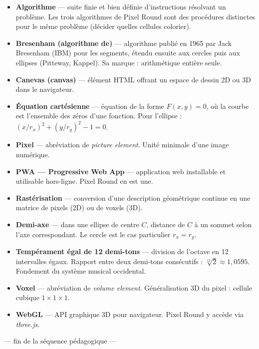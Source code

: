 \documentclass[12pt,a4paper]{scrartcl}
\newcommand{\acc}[1]{\textcolor{accent}{\textbf{#1}}}
\begin{document}
\begin{itemize}[leftmargin=1.4em,itemsep=0.3em,topsep=0.3em]
  \item \acc{Algorithme} --- suite finie et bien définie d'instructions résolvant un problème. Les trois algorithmes de Pixel Round sont des procédures distinctes pour le même problème (décider quelles cellules colorier).
  \item \acc{Bresenham (algorithme de)} --- algorithme publié en 1965 par Jack Bresenham (IBM) pour les segments, étendu ensuite aux cercles puis aux ellipses (Pitteway, Kappel). Sa marque : arithmétique entière seule.
  \item \acc{Canevas (canvas)} --- élément HTML offrant un espace de dessin 2D ou 3D dans le navigateur.
  \item \acc{Équation cartésienne} --- équation de la forme $F(x, y) = 0$, où la courbe est l'ensemble des zéros d'une fonction. Pour l'ellipse : $(x/r_x)^2 + (y/r_y)^2 - 1 = 0$.
  \item \acc{Pixel} --- abréviation de \emph{picture element}. Unité minimale d'une image numérique.
  \item \acc{PWA --- Progressive Web App} --- application web installable et utilisable hors-ligne. Pixel Round en est une.
  \item \acc{Rastérisation} --- conversion d'une description géométrique continue en une matrice de pixels (2D) ou de voxels (3D).
  \item \acc{Demi-axe} --- dans une ellipse de centre $C$, distance de $C$ à un sommet selon l'axe correspondant. Le cercle est le cas particulier $r_x = r_y$.
  \item \acc{Tempérament égal de 12 demi-tons} --- division de l'octave en 12 intervalles égaux. Rapport entre deux demi-tons consécutifs : $\sqrt[12]{2} \approx 1{,}0595$. Fondement du système musical occidental.
  \item \acc{Voxel} --- abréviation de \emph{volume element}. Généralisation 3D du pixel : cellule cubique $1 \times 1 \times 1$.
  \item \acc{WebGL} --- API graphique 3D pour navigateur. Pixel Round y accède via \emph{three.js}.
\end{itemize}

\vspace{2em}
\begin{center}
\color{muted}\small\sffamily
--- fin de la séquence pédagogique ---
\end{center}
\end{document}
